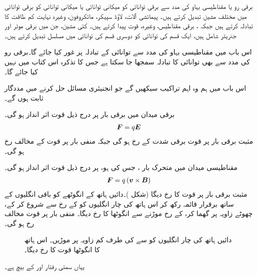 برقی رو یا مقناطیسی بہاو کی مدد سے برقی توانائی کو میکانی توانائی یا میکانی توانائی کو برقی توانائی میں مختلف مشین تبدیل کرتے ہیں۔ پیمائشی آلات، لاؤڈ سپیکر، مائکروفون، وغیرہ  نہایت کم طاقت کا تبادلہ کرتے ہیں جبکہ  ، برقی مقناطیس، وغیرہ،  قوت پیدا کرتے ہیں۔ کئی مشین، جن میں برقی موٹر اور جنریٹر شامل ہیں،   ایک قسم کی توانائی کو  دوسری قسم کی توانائی میں مسلسل تبدیل کرتے ہیں۔

اس باب میں مقناطیسی بہاو کی مدد سے توانائی کے تبادلہ پر غور کیا جائے گا۔برقی رو کی مدد سے بھی توانائی کا تبادلہ سمجھا جا سکتا ہے جس کا تذکرہ اس کتاب میں نہیں کیا جائے گا۔

اس باب میں ہم وہ اہم تراکیب سیکھیں گے جو انجنیئری مسائل حل کرنے میں مددگار ثابت ہوں گے۔

برقی میدان  میں برقی بار   پر درج ذیل قوت اثر انداز ہو گی۔
\begin{align}\label{مساوات_تبادلہ_برقی_میدان_قوت}
{\ensuremath{{\boldsymbol{F}}}}=q {{\boldsymbol{E}}}
\end{align}
مثبت برقی بار پر قوت  برقی شدت  کے رخ ہو گی جبکہ منفی  بار پر قوت  کے مخالف رخ ہو گی۔

مقناطیسی میدان میں متحرک بار ، جس کی   ہو، پر  درج ذیل قوت اثر انداز ہو گی۔
\begin{align}\label{مساوات_برقی_میکانی_تبادلہ_مقناطیسی}
{\ensuremath{{\boldsymbol{F}}}}=q \left({{\boldsymbol{v}}} \times {\ensuremath{{\boldsymbol{B}}}} \right)
\end{align}
مثبت برقی بار پر  قوت کا رخ   دیگا (شکل )۔دائیں ہاتھ کے انگوٹھے  کو باقی انگلیوں کے ساتھ برقرار قائمہ رکھ کر اس ہاتھ کی چار انگلیوں کو  کے رخ سے شروع کر کے، چھوٹے زاویہ پر گھما کر،   کے رخ  موڑنے سے انگوٹھا  کا رخ دیگا۔ منفی بار پر قوت  مخالف رخ ہو گی۔

\begin{figure}
\centering
{}
\caption{
دائیں ہاتھ کی چار انگلیوں کو  سے  کی طرف کم زاویہ پر موڑیں۔ اس ہاتھ کا انگوٹھا قوت  کا رخ دیگا۔
}
\label{شکل_تبادلہ_توانائی_دائیں_ہاتھ_قانون}
\end{figure}
یہاں سمتی رفتار  اور  کے بیچ ہے۔

